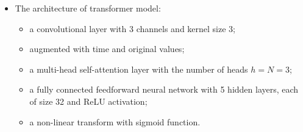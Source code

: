 \documentclass[]{article}
\renewcommand{\(}{\left(}
\renewcommand{\)}{\right)}
\begin{document}
\begin{itemize}
		\begin{itemize}
			\item[-] a convolutional layer with 3 channels and kernel size 3;
			\item[-] augmented with time and original values;
			\item[-] taking the signature transform with truncation order $N=3$;
			\item[-] a fully connected feedforward neural network with 5 hidden layers, each of size 32 and ReLU activation;
			\item[-] a non-linear transform with sigmoid function.
		\end{itemize}
		\item The architecture of transformer model:
		\begin{itemize}
			\item[-] a convolutional layer with 3 channels and kernel size 3;
			\item[-] augmented with time and original values;
			\item[-] a multi-head self-attention layer with the number of heads $h=N=3$;
			\item[-] a fully connected feedforward neural network with 5 hidden layers, each of size 32 and ReLU activation;
			\item[-] a non-linear transform with sigmoid function.
		\end{itemize}
	\end{itemize}
\end{document}
